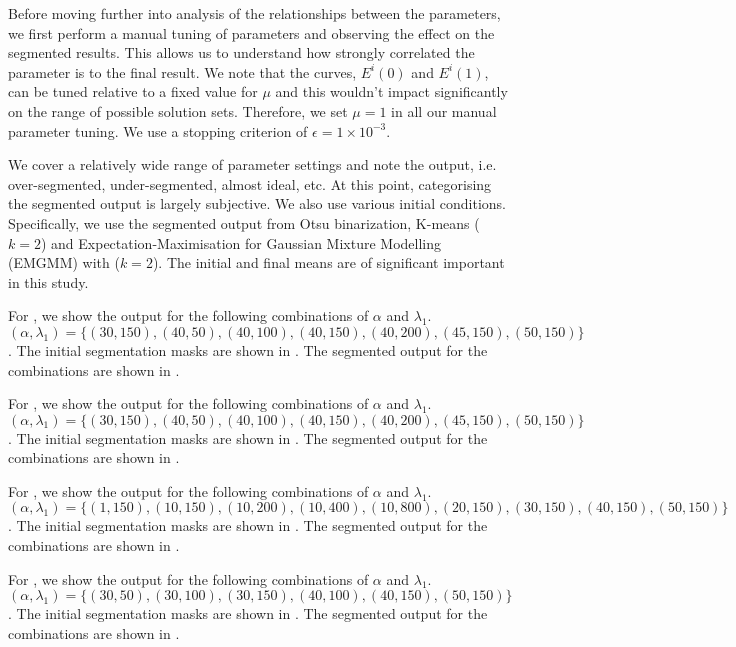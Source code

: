 \begin{definition} Before moving further into analysis of the relationships between the parameters, we first perform a manual tuning of parameters and observing the effect on the segmented results. This allows us to understand how strongly correlated the parameter is to the final result. We note that the curves, $E^i(0)$ and $E^i(1)$, can be tuned relative to a fixed value for $\mu$ and this wouldn't impact significantly on the range of possible solution sets. Therefore, we set $\mu=1$ in all our manual parameter tuning. We use a stopping criterion of $\epsilon=1\times10^{-3}$.
	
We cover a relatively wide range of parameter settings and note the output, i.e. over-segmented, under-segmented, almost ideal, etc. At this point, categorising the segmented output is largely subjective. We also use various initial conditions. Specifically, we use the segmented output from Otsu binarization, K-means ($k=2$) and Expectation-Maximisation for Gaussian Mixture Modelling (EMGMM) with ($k=2$). The initial and final means are of significant important in this study.

For , we show the output for the following combinations of $\alpha$ and $\lambda_1$. $(\alpha,\lambda_1) = \{(30,150), (40,50), (40,100), (40,150), (40,200), (45,150), (50,150)\}$. The initial segmentation masks are shown in . The segmented output for the combinations are shown in .

For , we show the output for the following combinations of $\alpha$ and $\lambda_1$. $(\alpha,\lambda_1) = \{(30,150), (40,50), (40,100), (40,150), (40,200), (45,150), (50,150)\}$. The initial segmentation masks are shown in . The segmented output for the combinations are shown in .

For , we show the output for the following combinations of $\alpha$ and $\lambda_1$. $(\alpha,\lambda_1) = \{(1,150), (10,150), (10,200), (10,400), (10,800), (20,150), (30,150), (40,150), (50,150)\}$. The initial segmentation masks are shown in . The segmented output for the combinations are shown in .

For , we show the output for the following combinations of $\alpha$ and $\lambda_1$. $(\alpha,\lambda_1) = \{(30,50), (30,100), (30,150), (40,100), (40,150), (50,150)\}$. The initial segmentation masks are shown in . The segmented output for the combinations are shown in .


\end{definition}
